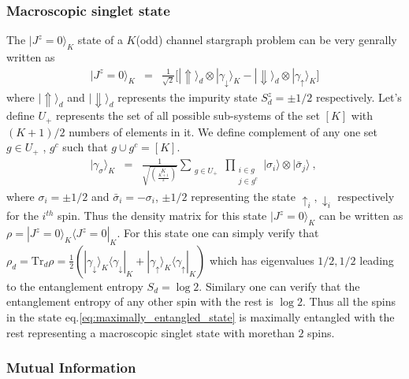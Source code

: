 \documentclass[reprint,prb,superscriptaddress]{revtex4-1}
\begin{document}
\subsubsection{Macroscopic singlet state}
\noindent  The $|J^z=0\rangle_{K} $ state of a $K$(odd) channel stargraph problem can be very genrally written as
\begin{eqnarray}
|J^z=0\rangle_K &=& \frac{1}{\sqrt{2}} \bigg[ |\Uparrow\rangle_d \otimes |\gamma_{\downarrow}\rangle_K -  |\Downarrow\rangle_d \otimes |\gamma_{\uparrow}\rangle_K \bigg]  
\label{eq:maximally_entangled_state}
\end{eqnarray}
where $|\Uparrow\rangle_d$ and $|\Downarrow\rangle_d$ represents the impurity state $S_d^z=\pm 1/2$ respectively. Let's define $U_{+}$ represents the set of all possible sub-systems of the set $[K]$ with $(K+1)/2$ numbers of elements in it. We define complement of any one set $g\in U_+$ , $g^{c}$ such that $g\cup g^{c}=[K]$.
\begin{eqnarray}
|\gamma_{\sigma} \rangle_K &=& \frac{1}{\sqrt{{K \choose \frac{K+1}{2}} }} \displaystyle\sum_{\substack{ g\in U_{+} }} \prod_{\substack{i\in g \\j\in g^c}} |\sigma_i\rangle \otimes |\bar{\sigma}_j \rangle~,~ 
\end{eqnarray}
where $\sigma_i=\pm 1/2$ and $\bar{\sigma}_i=-\sigma_i$, $\pm 1/2$ representing the state $\uparrow_i,\downarrow_i$ respectively for the $i^{th}$ spin. Thus the density matrix for this state $|J^z=0\rangle_K$ can be written as $\rho=|J^z=0\rangle_K \langle J^z=0|_K$. For this state one can simply verify that $\rho_{d}=\textrm{Tr}_d \rho=\frac{1}{2} (|\gamma_{\downarrow}\rangle_K \langle\gamma_{\downarrow}|_K + |\gamma_{\uparrow}\rangle_K \langle\gamma_{\uparrow}|_K)$  which has eigenvalues $1/2,1/2$ leading to the entanglement entropy $S_{d}= \log 2$. Similary one can verify that the entanglement entropy of any other spin with the rest is $\log 2$. Thus all the spins in the state eq.\eqref{eq:maximally_entangled_state} is maximally entangled with the rest representing a macroscopic singlet state with morethan $2$ spins.



\subsubsection{Mutual Information}
\end{document}
